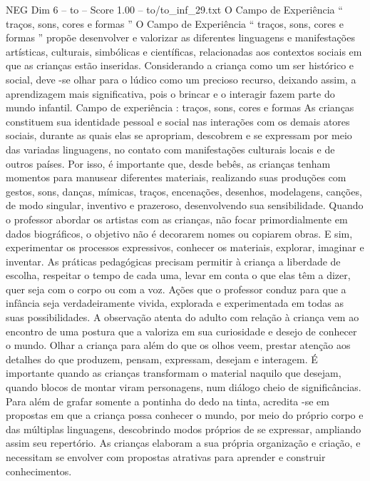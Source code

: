 \begin{textsample}{NEG Dim 6 – to – Score 1.00 – to/to\_inf\_29.txt}  \label{ex:f6_neg_120}
O Campo de Experiência “ traços, sons, cores e formas ” O Campo de Experiência “ traços, sons, cores e formas ” propõe desenvolver e valorizar as diferentes linguagens e manifestações artísticas, culturais, simbólicas e científicas, relacionadas aos contextos sociais em que as crianças estão inseridas.
Considerando a criança como um ser histórico e social, deve -se olhar para o lúdico como um precioso recurso, deixando assim, a aprendizagem mais significativa, pois o brincar e o interagir fazem parte do mundo infantil.
Campo de experiência : traços, sons, cores e formas As crianças constituem sua identidade pessoal e social nas interações com os demais atores sociais, durante as quais elas se apropriam, descobrem e se expressam por meio das variadas linguagens, no contato com manifestações culturais locais e de outros países.
Por isso, é importante que, desde bebês, as crianças tenham momentos para manusear diferentes materiais, realizando suas produções com gestos, sons, danças, mímicas, traços, encenações, desenhos, modelagens, canções, de modo singular, inventivo e prazeroso, desenvolvendo sua sensibilidade.
Quando o professor abordar os artistas com as crianças, não focar primordialmente em dados biográficos, o objetivo não é decorarem nomes ou copiarem obras.
E sim, experimentar os processos expressivos, conhecer os materiais, explorar, imaginar e inventar.
As práticas pedagógicas precisam permitir à criança a liberdade de escolha, respeitar o tempo de cada uma, levar em conta o que elas têm a dizer, quer seja com o corpo ou com a voz.
Ações que o professor conduz para que a infância seja verdadeiramente vivida, explorada e experimentada em todas as suas possibilidades.
A observação atenta do adulto com relação à criança vem ao encontro de uma postura que a valoriza em sua curiosidade e desejo de conhecer o mundo.
Olhar a criança para além do que os olhos veem, prestar atenção aos detalhes do que produzem, pensam, expressam, desejam e interagem.
É importante quando as crianças transformam o material naquilo que desejam, quando blocos de montar viram personagens, num diálogo cheio de significâncias.
Para além de grafar somente a pontinha do dedo na tinta, acredita -se em propostas em que a criança possa conhecer o mundo, por meio do próprio corpo e das múltiplas linguagens, descobrindo modos próprios de se expressar, ampliando assim seu repertório.
As crianças elaboram a sua própria organização e criação, e necessitam se envolver com propostas atrativas para aprender e construir conhecimentos.

\end{textsample}
